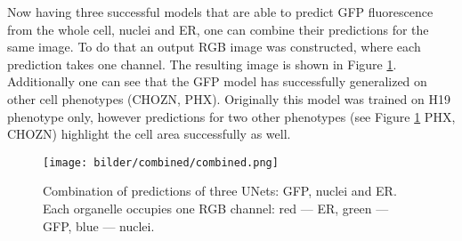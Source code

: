 Now having three successful models that are able to predict GFP fluorescence from the whole cell, nuclei and ER, one can combine their predictions for the same image. To do that an output RGB image was constructed, where each prediction takes one channel. The resulting image is shown in Figure \ref{fig:combined}. Additionally one can see that the GFP model has successfully generalized on other cell phenotypes (CHOZN, PHX). Originally this model was trained on H19 phenotype only, however predictions for two other phenotypes (see Figure  \ref{fig:combined} PHX, CHOZN) highlight the cell area successfully as well.

\begin{figure}[htb]
	\begin{center}
		\texttt{[image: bilder/combined/combined.png]}
		\caption[GFP, Nuclei and ER combined]%
		{Combination of predictions of three UNets: GFP, nuclei and ER. Each organelle occupies one RGB channel: red --- ER, green --- GFP, blue --- nuclei.}\label{fig:combined}
	\end{center}
\end{figure}
